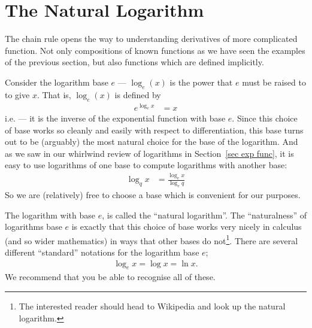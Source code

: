 \section{The Natural Logarithm}\label{sec diff logs}
The chain rule opens the way to understanding derivatives of more complicated
function. Not only compositions of known functions as we have seen the
examples of the previous section, but also functions which are defined
implicitly.

Consider the logarithm base $e$ --- $\log_e(x)$ is the power that $e$ must be
raised to to give $x$.  That is, $\log_e(x)$ is defined by
\begin{align*}
  e^{\log_e x} &= x
\end{align*}
i.e. --- it is the inverse of the exponential function with base $e$.  Since this
choice of base works so cleanly and easily with respect to differentiation,
this base turns out to be (arguably) the most natural choice for the base
of the logarithm. And as we saw in our whirlwind review of
logarithms in Section~\ref{sec exp func}, it is easy to use logarithms of
one base to compute logarithms with another base:
\begin{align*}
  \log_q x &= \frac{\log_e x}{\log_e q}
\end{align*}
So we are (relatively) free to choose a base which is convenient for our
purposes.

The logarithm with base $e$, is called the ``natural logarithm''. The
``naturalness'' of logarithms base $e$ is exactly that this choice of base
works very nicely in calculus (and so wider mathematics) in ways that other
bases do not\footnote{The interested reader should head to Wikipedia and look
up the natural logarithm.}. There are several different ``standard'' notations
for the logarithm base
$e$;
\begin{align*}
  \log_e x = \log x = \ln x.
\end{align*}
We recommend that you be able to recognise all of these.



